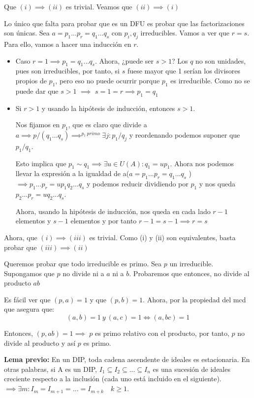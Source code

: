 \documentclass[11pt, a4paper, titlepage]{article}
\makeatletter
\renewenvironment{proof}[1][\proofname] {\vspace{-15pt}\par\pushQED{\qed}\normalfont\topsep6\p@\@plus6\p@\relax\trivlist\item[\hskip\labelsep\it#1\@addpunct{.}]\ignorespaces}{\popQED\endtrivlist\@endpefalse}
\theoremstyle{theorem-style}
\theoremstyle{definition-style}
\theoremstyle{remark-style}
\theoremstyle{example-style}
\makeatother
\begin{document}
\begin{proof}
	Que $(i)\implies (ii)$ es trivial. Veamos que $(ii) \implies (i)$
	
	Lo único que falta para probar que es un DFU es probar que las factorizaciones son únicas. Sea $a= p_1...p_r = q_1...q_s$ con $p_i,q_j$ irreducibles. Vamos a ver que $r=s$. Para ello, vamos a hacer una inducción en $r$.
	
	\begin{itemize}
	\item Caso $r=1 \implies p_1 = q_1...q_s$. Ahora, ¿puede ser $s>1$? Los $q$ no son unidades, pues son irreducibles, por tanto, si $s$ fuese mayor que 1 serían los divisores propios de $p_1$, pero eso no puede ocurrir porque $p_1$ es irreducible. Como no se puede dar que $s>1$ $\implies$ $s=1=r \implies p_1 = q_1$
	
	\item Si $r> 1$ y usando la hipótesis de inducción, entonces $s > 1$.
	
	Nos fijamos en $p_1$, que es claro que divide a $a\implies p/(q_1...q_s)\implies^{p_1 \ primo} \exists j : p_1 /q_j$ y reordenando podemos suponer que $p_1/q_1$.
	
	Esto implica que $p_1 \sim q_1 \implies \exists u \in U(A): q_1 = up_1$. Ahora nos podemos llevar la expresión a la igualdad de a($a= p_1...p_r = q_1...q_s$ ) $\implies p_1...p_r = up_1q_2...q_s $ y podemos reducir dividiendo por $p_1$ y nos queda $p_2...p_r = uq_2...q_s$. 
	
	Ahora, usando la hipótesis de inducción, nos queda en cada lado $r-1$ elementos y $s-1$ elementos y por tanto $r-1 =s-1\implies r=s$
\end{itemize}

Ahora, que $(i) \implies (iii)$ es trivial. Como (i) y (ii) son equivalentes, basta probar que $(iii) \implies (ii)$

Queremos probar que todo irreducible es primo. Sea $p$ un irreducible. Supongamos que $p$ no divide ni a $a$ ni a $b$. Probaremos que entonces, no divide al producto $ab$

Es fácil ver que $(p,a) = 1$ y que $(p,b) = 1$. Ahora, por la propiedad del mcd que asegura que:
\[
(a,b) = 1 \ y \ (a,c) = 1 \iff (a,bc) = 1
\]

Entonces, $(p,ab) = 1 \implies$ $p$ es primo relativo con el producto, por tanto, $p$ no divide al producto y así $p$ es primo.
\end{proof}

	\textbf{Lema previo:} En un DIP, toda cadena ascendente de ideales es estacionaria. En otras palabras, si A es un DIP, $I_1 \subseteq I_2 \subseteq ... \subseteq I_{n}$ es una sucesión de ideales creciente respecto a la inclusión (cada uno está incluido en el siguiente). $\implies \exists m : I_m = I_{m+1} = ... = I_{m+k} \quad k \geq 1$.
	
\end{document}
